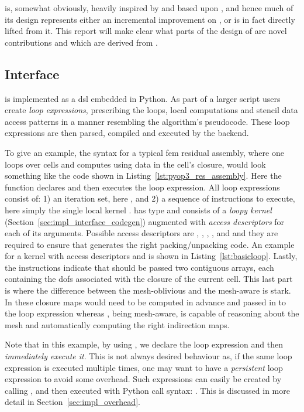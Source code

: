  is, somewhat obviously, heavily inspired by and based upon , and hence much of its design represents either an incremental improvement on , or is in fact directly lifted from it.
This report will make clear what parts of the design of  are novel contributions and which are derived from .

\subsection{Interface}
\label{sec:impl_interface}

 is implemented as a \gls{dsl} embedded in Python.
As part of a larger script users create \textit{loop expressions}, prescribing the loops, local computations and stencil data access patterns in a manner resembling the algorithm's pseudocode.
These loop expressions are then parsed, compiled and executed by the  backend.

To give an example, the syntax for a typical \gls{fem} residual assembly, where one loops over cells and computes using data in the cell's closure, would look something like the code shown in Listing~\ref{lst:pyop3_res_assembly}.
Here the function  declares and then executes the loop expression.
All loop expressions consist of:
1) an iteration set, here , and
2) a sequence of instructions to execute, here simply the single local kernel .
 has type  and consists of a \textit{loopy kernel} (Section~\ref{sec:impl_interface_codegen}) augmented with \textit{access descriptors} for each of its arguments.
Possible access descriptors are , , , ,  and  and they are required to ensure that  generates the right packing/unpacking code.
An example for a kernel with access descriptors  and  is shown in Listing~\ref{lst:basicloop}.
Lastly, the  instructions indicate that  should be passed two contiguous arrays, each containing the \glspl{dof} associated with the closure of the current cell.
This last part is where the difference between the mesh-oblivious  and the mesh-aware  is stark.
In  these closure maps would need to be computed in advance and passed in to the loop expression whereas , being mesh-aware, is capable of reasoning about the mesh and automatically computing the right indirection maps.

Note that in this example, by using , we declare the loop expression and then \textit{immediately execute it}.
This is not always desired behaviour as, if the same loop expression is executed multiple times, one may want to have a \textit{persistent} loop expression to avoid some overhead.
Such expressions can easily be created by calling , and then executed with Python call syntax: .
This is discussed in more detail in Section~\ref{sec:impl_overhead}.

